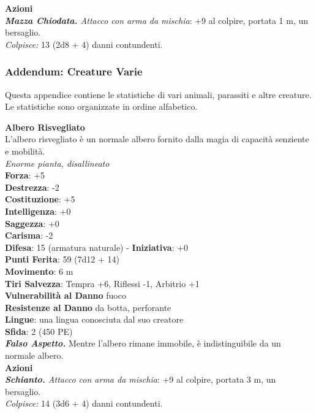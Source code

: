 \begin{multicols}{2}
\smallskip\textbf{Azioni}\\
\emph{\textbf{Mazza Chiodata.} Attacco con arma da mischia}: +9 al colpire, portata 1 m, un bersaglio.\\
\emph{Colpisce:} 13 (2d8 + 4) danni contundenti.\\

\vspace*{\fill}

\pagebreak

\subsubsection{Addendum: Creature Varie}

Questa appendice contiene le statistiche di vari animali, parassiti e altre creature. Le statistiche sono organizzate in ordine alfabetico.

\medskip\textbf{Albero Risvegliato}\\
L'albero risvegliato è un normale albero fornito dalla magia di capacità senziente e mobilità.\\
\emph{Enorme pianta, disallineato}\\
\textbf{Forza}: +5\\
\textbf{Destrezza}: -2\\
\textbf{Costituzione}: +5\\
\textbf{Intelligenza}: +0\\
\textbf{Saggezza}: +0\\
\textbf{Carisma}: -2\\
\textbf{Difesa}: 15 (armatura naturale) - \textbf{Iniziativa}: +0\\
\textbf{Punti Ferita}: 59 (7d12 + 14)\\
\textbf{Movimento}: 6 m\\
\textbf{Tiri Salvezza}: Tempra +6, Riflessi -1, Arbitrio +1\\
\textbf{Vulnerabilità al Danno} fuoco\\
\textbf{Resistenze al Danno} da botta, perforante\\
\textbf{Lingue}: una lingua conosciuta dal suo creatore\\
\textbf{Sfida}: 2 (450 PE)\smallskip\\
\emph{\textbf{Falso Aspetto.}} Mentre l'albero rimane immobile, è indistinguibile da un normale albero.\\
\smallskip\textbf{Azioni}\\
\emph{\textbf{Schianto.} Attacco con arma da mischia}: +9 al colpire, portata 3 m, un bersaglio.\\
\emph{Colpisce:} 14 (3d6 + 4) danni contundenti.\\


\end{multicols}
